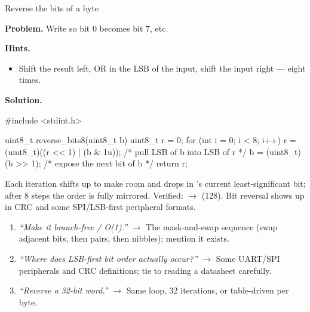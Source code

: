 \begin{gymproblem}{Reverse the bits of a byte}

\textbf{Problem.} Write  so bit 0 becomes bit
7, etc.

\textbf{Hints.}
\begin{itemize}
\item Shift the result left, OR in the LSB of the input, shift the input
  right --- eight times.
\end{itemize}

\attempt

\textbf{Solution.}
\begin{cgym}
#include <stdint.h>

uint8_t reverse_bits8(uint8_t b) {
    uint8_t r = 0;
    for (int i = 0; i < 8; i++) {
        r = (uint8_t)((r << 1) | (b & 1u));  /* pull LSB of b into LSB of r */
        b = (uint8_t)(b >> 1);               /* expose the next bit of b    */
    }
    return r;
}
\end{cgym}

Each iteration shifts  up to make room and drops in 's current
least-significant bit; after 8 steps the order is fully mirrored. Verified:
 $\rightarrow$  (128). Bit reversal shows up in CRC and
some SPI/LSB-first peripheral formats.

\followups
\begin{enumerate}
\item \emph{``Make it branch-free / O(1).''} $\rightarrow$ The mask-and-swap
  sequence (swap adjacent bits, then pairs, then nibbles); mention it exists.
\item \emph{``Where does LSB-first bit order actually occur?''} $\rightarrow$
  Some UART/SPI peripherals and CRC definitions; tie to reading a datasheet
  carefully.
\item \emph{``Reverse a 32-bit word.''} $\rightarrow$ Same loop, 32 iterations,
  or table-driven per byte.
\end{enumerate}
\end{gymproblem}

